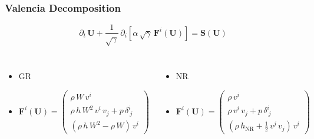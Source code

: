 \documentclass{beamer}
\newcommand{\p}{\partial}
\newcommand{\bs}{\boldsymbol}
\newcommand{\nr}{\mathrm{NR}}
\begin{document}
\begin{frame}
\frametitle{Valencia Decomposition}

  \begin{equation*}
    \p_{t}\,\bs{U}
    +\frac{1}{\sqrt{\gamma}}\,
    \p_{i}\left[\alpha\,\sqrt{\gamma}\,\bs{F}^{i}\left(\bs{U}\right)\right]
    =\bs{S}\left(\bs{U}\right)
  \end{equation*}

  \begin{columns}[c]


      \begin{itemize}
        \item[]
          GR
        \item[]
          $\bs{F}^{i}\left(\bs{U}\right)
          =\begin{pmatrix}
             \rho\,W\,v^{i} \\[1em]
             \rho\,h\,W^{2}\,v^{i}\,v_{j} + p\,\delta^{i}_{~j} \\[1em]
             \left(\rho\,h\,W^{2}-\rho\,W\right)\,v^{i}
           \end{pmatrix}$
      \end{itemize}


      \begin{itemize}
        \item[]
          NR
        \item[]
          $\bs{F}^{i}\left(\bs{U}\right)
          =\begin{pmatrix}
             \rho\,v^{i} \\[1em]
             \rho\,v^{i}\,v_{j} + p\,\delta^{i}_{~j} \\[1em]
             \left(\rho\,h_{\nr}+\frac{1}{2}\,v^{j}\,v_{j}\right)\,v^{i}
           \end{pmatrix}$
      \end{itemize}

  \end{columns}

\end{frame}
\end{document}
